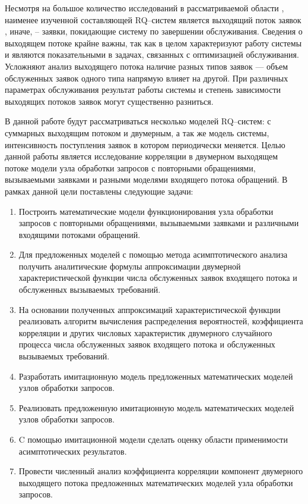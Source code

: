 Несмотря на большое количество исследований в рассматриваемой области \cite{artalejo2010mean,nazarov2017asymptotic,phung2019retrial,kulkarni1983queueing,paul2018retrial}, наименее изученной составляющей RQ--систем является выходящий поток заявок \cite{daley1976queueing}, иначе, -- заявки, покидающие систему по завершении обслуживания. Сведения о выходящем потоке крайне важны, так как в целом характеризуют работу системы и являются показательными в задачах, связанных с оптимизацией обслуживания. Усложняют анализ выходящего потока наличие разных типов заявок --- объем обслуженных заявок одного типа напрямую влияет на другой. При различных параметрах обслуживания результат работы системы и степень зависимости выходящих потоков заявок могут существенно разниться. 

В данной работе будут рассматриваться несколько моделей RQ--систем: с суммарных выходящим потоком и двумерным, а так же модель системы, интенсивность поступления заявок в котором периодически меняется. Целью данной работы является исследование корреляции в двумерном выходящем потоке модели узла обработки запросов с повторными обращениями, вызываемыми заявками и разными моделями входящего потока обращений. В рамках данной цели поставлены следующие задачи:
\begin{enumerate}
	\item Построить математические модели функционирования узла обработки запросов с повторными обращениями, вызываемыми заявками и различными входящими потоками обращений.
	\item Для предложенных моделей с помощью метода асимптотического анализа получить аналитические формулы аппроксимации двумерной характеристической функции числа обслуженных заявок входящего потока и обслуженных вызываемых требований. 
	\item На основании полученных аппроксимаций характеристической функции реализовать алгоритм вычисления распределения вероятностей, коэффициента корреляции и других числовых характеристик двумерного случайного процесса числа обслуженных заявок входящего потока и обслуженных вызываемых требований.
	\item Разработать имитационную модель предложенных математических моделей узлов обработки запросов.
	\item Реализовать предложенную имитационную модель математических моделей узлов обработки запросов.
	\item C помощью имитационной модели сделать оценку области применимости асимптотических результатов.
	\item Провести численный анализ коэффициента корреляции компонент двумерного выходящего потока предложенных математических моделей узла обработки запросов.
\end{enumerate}


 \clearpage